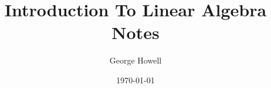 \documentclass{article}
\title{Introduction To Linear Algebra Notes}
\author{George Howell}
\date{\today}
\begin{document}
    \maketitle
    \newpage

    \tableofcontents
    \newpage

    
    \pagebreak
    
    \pagebreak
    
    \pagebreak
    
\end{document}
